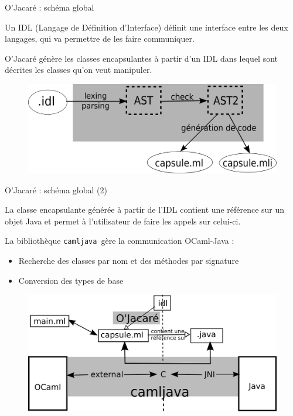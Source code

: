 \documentclass[xcolor={table,dvipsnames}]{beamer}
\newcommand{\camljava}{{\tt{camljava}}}
\begin{document}
\begin{frame}{O'Jacaré : schéma global }

\begin{definition}
Un \alert{IDL} (Langage de Définition d'Interface) définit une interface entre les deux langages, qui va permettre de les faire communiquer.
\end{definition}

O'Jacaré génère les classes encapsulantes à partir d'un IDL dans lequel sont décrites les classes qu'on veut manipuler.
\medskip
\begin{figure}[h]
  \centering
  \includegraphics[scale=0.9]{schemaOjacare.png}
\end{figure}

\end{frame}


\begin{frame}{O'Jacaré : schéma global (2) }
  \begin{definition}
    La \alert{classe encapsulante} générée à partir de l'IDL contient une référence sur un objet Java et permet à l'utilisateur de faire les appels sur celui-ci.
  \end{definition}
La bibliothèque \camljava \ gère la communication OCaml-Java :
\begin{itemize}
\item Recherche des classes par nom et des méthodes par signature
\item Conversion des types de base
\end{itemize}
\begin{figure}[h!]
  \centering
  \includegraphics[scale=0.8]{schemaCamljava2.png}
\end{figure}

\end{frame}
\end{document}
